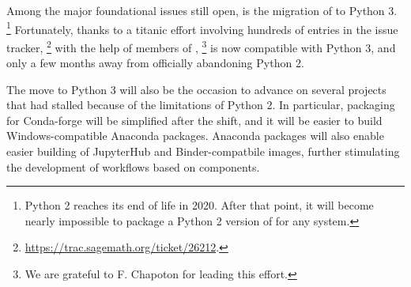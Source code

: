 \documentclass{deliverablereport}
\begin{document}
Among the major foundational issues still open, is the migration of
\Sage to Python 3.%
\footnote{Python 2 reaches its end of life in 2020. After that point,
  it will become nearly impossible to package a Python 2 version of
  \Sage for any system.} %
Fortunately, thanks to a titanic effort involving hundreds of entries
in the issue tracker,%
\footnote{\url{https://trac.sagemath.org/ticket/26212}.}  with the
help of members of \ODK,%
\footnote{We are grateful to F. Chapoton for leading this effort.}
\Sage is now compatible with Python 3, and only a few months away from
officially abandoning Python 2.

The move to Python 3 will also be the occasion to advance on several
projects that had stalled because of the limitations of Python 2. %
In particular, packaging for Conda-forge will be simplified after the
shift, and it will be easier to build Windows-compatible Anaconda
packages. %
Anaconda packages will also enable easier building of JupyterHub and
Binder-compatbile images, further stimulating the development of
workflows based on \ODK components.
\end{document}
